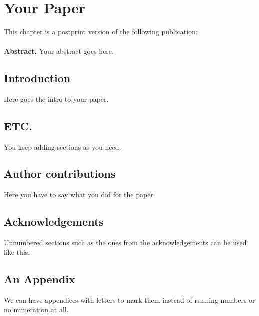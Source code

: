 

\chapter{Your Paper}

This chapter is a postprint version of the following publication:\\
\noindent{}\\


\noindent\textbf{Abstract.}
Your abstract goes here.

\section{Introduction}
Here goes the intro to your paper.

\section{ETC.}
You keep adding sections as you need.

\section*{Author contributions}
Here you have to say what you did for the paper.

\section*{Acknowledgements}
Unnumbered sections such as the ones from the acknowledgements can be used like this.

\begin{subappendices}

\section{An Appendix}
We can have appendices with letters to mark them instead of running numbers or no numeration at all.

    
\end{subappendices}
